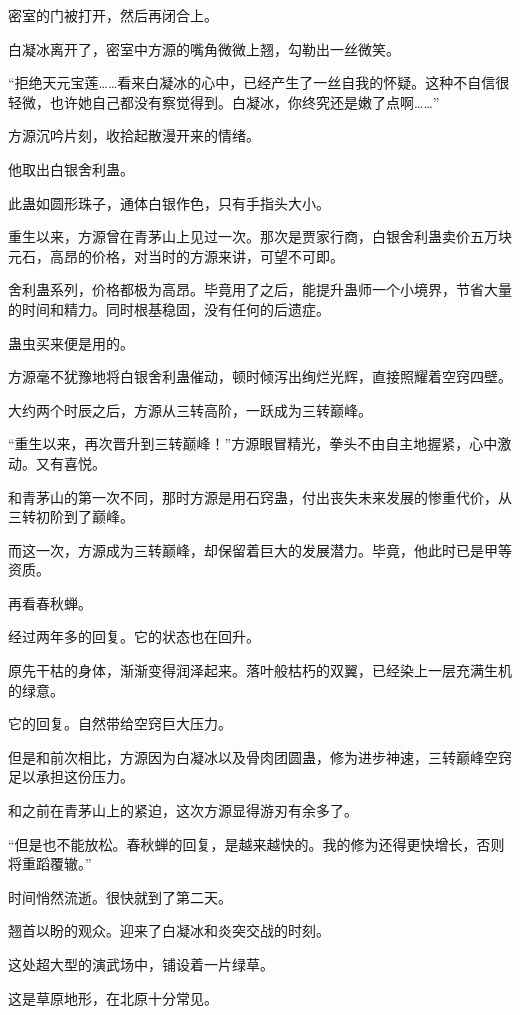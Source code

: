 \begin{this_body}
密室的门被打开，然后再闭合上。

白凝冰离开了，密室中方源的嘴角微微上翘，勾勒出一丝微笑。

“拒绝天元宝莲……看来白凝冰的心中，已经产生了一丝自我的怀疑。这种不自信很轻微，也许她自己都没有察觉得到。白凝冰，你终究还是嫩了点啊……”

方源沉吟片刻，收拾起散漫开来的情绪。

他取出白银舍利蛊。

此蛊如圆形珠子，通体白银作色，只有手指头大小。

重生以来，方源曾在青茅山上见过一次。那次是贾家行商，白银舍利蛊卖价五万块元石，高昂的价格，对当时的方源来讲，可望不可即。

舍利蛊系列，价格都极为高昂。毕竟用了之后，能提升蛊师一个小境界，节省大量的时间和精力。同时根基稳固，没有任何的后遗症。

蛊虫买来便是用的。

方源毫不犹豫地将白银舍利蛊催动，顿时倾泻出绚烂光辉，直接照耀着空窍四壁。

大约两个时辰之后，方源从三转高阶，一跃成为三转巅峰。

“重生以来，再次晋升到三转巅峰！”方源眼冒精光，拳头不由自主地握紧，心中激动。又有喜悦。

和青茅山的第一次不同，那时方源是用石窍蛊，付出丧失未来发展的惨重代价，从三转初阶到了巅峰。

而这一次，方源成为三转巅峰，却保留着巨大的发展潜力。毕竟，他此时已是甲等资质。

再看春秋蝉。

经过两年多的回复。它的状态也在回升。

原先干枯的身体，渐渐变得润泽起来。落叶般枯朽的双翼，已经染上一层充满生机的绿意。

它的回复。自然带给空窍巨大压力。

但是和前次相比，方源因为白凝冰以及骨肉团圆蛊，修为进步神速，三转巅峰空窍足以承担这份压力。

和之前在青茅山上的紧迫，这次方源显得游刃有余多了。

“但是也不能放松。春秋蝉的回复，是越来越快的。我的修为还得更快增长，否则将重蹈覆辙。”

时间悄然流逝。很快就到了第二天。

翘首以盼的观众。迎来了白凝冰和炎突交战的时刻。

这处超大型的演武场中，铺设着一片绿草。

这是草原地形，在北原十分常见。


\end{this_body}
